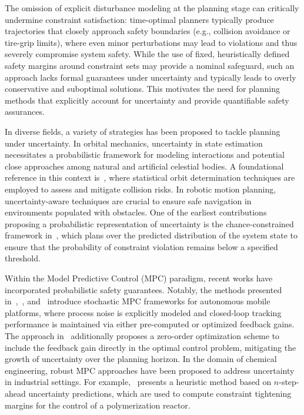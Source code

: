 The omission of explicit disturbance modeling at the planning stage can critically undermine constraint satisfaction: time-optimal planners typically produce trajectories that closely approach safety boundaries (e.g., collision avoidance or tire-grip limits), where even minor perturbations may lead to violations and thus severely compromise system safety.
While the use of fixed, heuristically defined safety margins around constraint sets may provide a nominal safeguard, such an approach lacks formal guarantees under uncertainty and typically leads to overly conservative and suboptimal solutions. This motivates the need for planning methods that explicitly account for uncertainty and provide quantifiable safety assurances.

In diverse fields, a variety of strategies has been proposed to tackle planning under uncertainty.                                          
In orbital mechanics, uncertainty in state estimation necessitates a probabilistic framework for modeling interactions and potential close approaches among natural and artificial celestial bodies.
A foundational reference in this context is~\cite{Tapley:StatisticalOrbitDetermination:2004}, where statistical orbit determination techniques are employed to assess and mitigate collision risks. In robotic motion planning, uncertainty-aware techniques are crucial to ensure safe navigation in environments populated with obstacles. One of the earliest contributions proposing a probabilistic representation of uncertainty is the chance-constrained framework in~\cite{Blackmore:ChanceConstrainedOptimalPath:2011}, which plans over the predicted distribution of the system state to ensure that the probability of constraint violation remains below a specified threshold. 

Within the Model Predictive Control (MPC) paradigm, recent works have incorporated probabilistic safety guarantees. Notably, the methods presented in~\cite{Gao:CollisionfreeMotionPlanning:2023},~\cite{Zhang:RobustifiedTimeoptimalPointtopoint:2025}, and~\cite{Zhang:RobustifiedTimeoptimalCollisionfree:2024} introduce stochastic MPC frameworks for autonomous mobile platforms, where process noise is explicitly modeled and closed-loop tracking performance is maintained via either pre-computed or optimized feedback gains. The approach in~\cite{Gao:CollisionfreeMotionPlanning:2023} additionally proposes a zero-order optimization scheme to include the feedback gain directly in the optimal control problem, mitigating the growth of uncertainty over the planning horizon.
In the domain of chemical engineering, robust MPC approaches have been proposed to address uncertainty in industrial settings. For example,~\cite{Krog:SimpleFastRobust:2024} presents a heuristic method based on $n$-step-ahead uncertainty predictions, which are used to compute constraint tightening margins for the control of a polymerization reactor.

